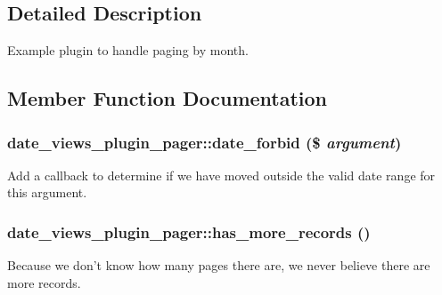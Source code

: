 \subsection{Detailed Description}
Example plugin to handle paging by month. 

\subsection{Member Function Documentation}
\hypertarget{classdate__views__plugin__pager_ae6523462e3a9ecd80749bf28a2cfcbeb}{
\subsubsection[{date\_\-forbid}]{\setlength{\rightskip}{0pt plus 5cm}date\_\-views\_\-plugin\_\-pager::date\_\-forbid (\$ {\em argument})}}
\label{classdate__views__plugin__pager_ae6523462e3a9ecd80749bf28a2cfcbeb}
Add a callback to determine if we have moved outside the valid date range for this argument. \hypertarget{classdate__views__plugin__pager_ab26f5d4b54954461e72b60789d6efbb1}{
\subsubsection[{has\_\-more\_\-records}]{\setlength{\rightskip}{0pt plus 5cm}date\_\-views\_\-plugin\_\-pager::has\_\-more\_\-records ()}}
\label{classdate__views__plugin__pager_ab26f5d4b54954461e72b60789d6efbb1}
Because we don't know how many pages there are, we never believe there are more records. 

